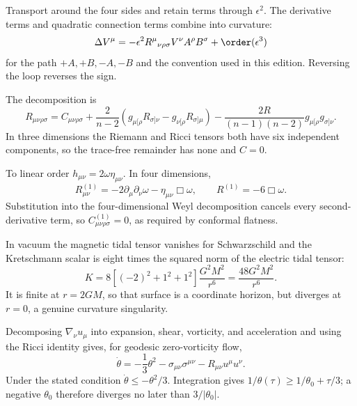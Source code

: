 \begin{solutions}
\begin{solution}
Transport around the four sides and retain terms through \(\epsilon^2\).
The derivative terms and quadratic connection terms combine into curvature:
\[
\Delta V^\mu
=-\epsilon^2R^\mu{}_{\nu\rho\sigma}
V^\nu A^\rho B^\sigma+\order(\epsilon^3)
\]
for the path \(+A,+B,-A,-B\) and the convention used in this edition.
Reversing the loop reverses the sign.
\end{solution}

\begin{solution}
The decomposition is
\[
R_{\mu\nu\rho\sigma}
=C_{\mu\nu\rho\sigma}
+\frac{2}{n-2}
\left(g_{\mu[\rho}R_{\sigma]\nu}
-g_{\nu[\rho}R_{\sigma]\mu}\right)
-\frac{2R}{(n-1)(n-2)}
g_{\mu[\rho}g_{\sigma]\nu}.
\]
In three dimensions the Riemann and Ricci tensors both have six independent
components, so the trace-free remainder has none and \(C=0\).
\end{solution}

\begin{solution}
To linear order \(h_{\mu\nu}=2\omega\eta_{\mu\nu}\).  In four dimensions,
\[
R^{(1)}_{\mu\nu}
=-2\partial_\mu\partial_\nu\omega
-\eta_{\mu\nu}\Box\omega,\qquad
R^{(1)}=-6\Box\omega.
\]
Substitution into the four-dimensional Weyl decomposition cancels every
second-derivative term, so \(C^{(1)}_{\mu\nu\rho\sigma}=0\), as required by
conformal flatness.
\end{solution}

\begin{solution}
In vacuum the magnetic tidal tensor vanishes for Schwarzschild and the
Kretschmann scalar is eight times the squared norm of the electric tidal
tensor:
\[
K=8\left[(-2)^2+1^2+1^2\right]\frac{G^2M^2}{r^6}
=\frac{48G^2M^2}{r^6}.
\]
It is finite at \(r=2GM\), so that surface is a coordinate horizon, but
diverges at \(r=0\), a genuine curvature singularity.
\end{solution}

\begin{solution}
Decomposing \(\nabla_\nu u_\mu\) into expansion, shear, vorticity, and
acceleration and using the Ricci identity gives, for geodesic zero-vorticity
flow,
\[
\dot\theta=-\frac13\theta^2-\sigma_{\mu\nu}\sigma^{\mu\nu}
-R_{\mu\nu}u^\mu u^\nu.
\]
Under the stated condition \(\dot\theta\leq-\theta^2/3\).  Integration gives
\(1/\theta(\tau)\geq1/\theta_0+\tau/3\); a negative \(\theta_0\) therefore
diverges no later than \(3/|\theta_0|\).
\end{solution}


\end{solutions}
